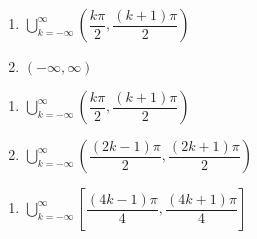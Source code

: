 \begin{multicols}{2}

\begin{enumerate}

\setcounter{enumi}{\value{HW}}

\item $\displaystyle \bigcup_{k=-\infty}^{\infty} \left( \dfrac{k\pi}{2}, \dfrac{(k+1)\pi}{2} \right)$
\item $(-\infty, \infty)$ 

\setcounter{HW}{\value{enumi}}

\end{enumerate}

\end{multicols}

\begin{multicols}{2}

\begin{enumerate}

\setcounter{enumi}{\value{HW}}

\item $\displaystyle \bigcup_{k=-\infty}^{\infty} \left( \dfrac{k\pi}{2}, \dfrac{(k+1)\pi}{2} \right)$
\item $\displaystyle \bigcup_{k=-\infty}^{\infty} \left( \dfrac{(2k - 1)\pi}{2}, \dfrac{(2k+1)\pi}{2} \right)$

\setcounter{HW}{\value{enumi}}

\end{enumerate}

\end{multicols}

\begin{enumerate}

\setcounter{enumi}{\value{HW}}

\item $\displaystyle \bigcup_{k=-\infty}^{\infty} \left[ \dfrac{(4k - 1)\pi}{4}, \dfrac{(4k+1)\pi}{4} \right]$

\setcounter{HW}{\value{enumi}}

\end{enumerate}

\closegraphsfile